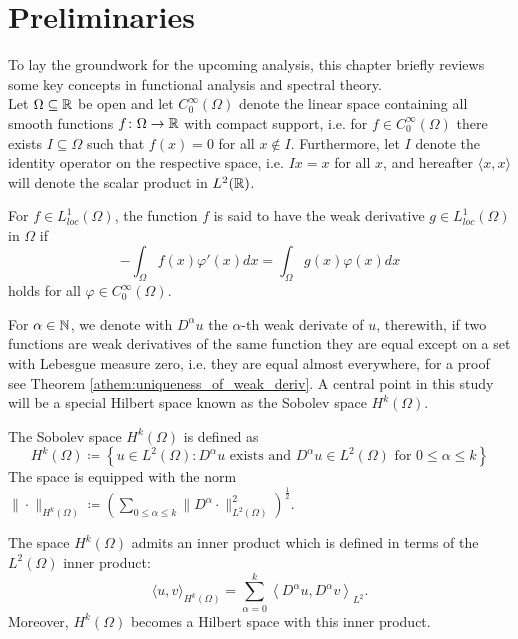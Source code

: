 \chapter{Preliminaries} \label{chap:2}

To lay the groundwork for the upcoming analysis, this chapter briefly reviews some key concepts in functional analysis and spectral theory.
~\\

Let $\Omega \subseteq \mathbb{R}$ be open and let $C_{0}^{\infty}(\Omega)$ denote the linear space containing all smooth functions $f \colon \Omega \rightarrow \mathbb{R}$ with compact support, i.e. for $f \in C_{0}^{\infty}(\Omega)$ there exists $I \subseteq \Omega$ such that $f(x) = 0$ for all $x \notin I$. Furthermore, let $I$ denote the identity operator on the respective space, i.e. $I x = x$ for all $x$, and hereafter $\langle x, x \rangle$ will denote the scalar product in $L^{2}(\mathbb{R})$.
\begin{definition}
For $f \in L^{1}_{loc}(\Omega)$, the function $f$ is said to have the weak derivative $g \in L^{1}_{loc}(\Omega)$ in $\Omega$ if
  \[ - \int_{\Omega} f(x) \varphi'(x) dx = \int_{\Omega} g(x) \varphi(x) dx \]
holds for all $\varphi \in C_{0}^{\infty}(\Omega)$.
\end{definition}
For $\alpha \in \mathbb{N}$, we denote with $D^{\alpha} u$ the $\alpha$-th weak derivate of $u$, therewith, if two functions are weak derivatives of the same function they are equal except on a set with Lebesgue measure zero, i.e. they are equal almost everywhere, for a proof see Theorem \ref{athem:uniqueness_of_weak_deriv}. A central point in this study will be a special Hilbert space known as the Sobolev space $H^{k}(\Omega)$. 

\begin{definition} The Sobolev space $H^{k}(\Omega)$ is defined as
\[ H^{k}(\Omega) \coloneqq \left\{ u \in L^{2}(\Omega) : D^{\alpha} u \text{ exists and } D^{\alpha} u \in L^{2}(\Omega) \text{ for } 0 \leq \alpha \leq k \right\} \]
The space is equipped with the norm $\| \cdot \|_{H^{k}(\Omega)} \coloneqq \left( \sum_{0 \leq \alpha \leq k} \| D^{\alpha} \cdot \|_{L^{2}(\Omega)}^{2} \right)^{\frac{1}{2}}$.
\end{definition}	

The space $H^{k}(\Omega)$ admits an inner product which is defined in terms of the $L^{2}(\Omega)$ inner product:
	\[  \langle u,v \rangle_{H^{k}(\Omega)} = \sum_{\alpha=0}^{k} \left\langle D^{\alpha} u, D^{\alpha} v \right \rangle_{L^2}. \]
Moreover, $H^{k}(\Omega)$ becomes a Hilbert space with this inner product.


